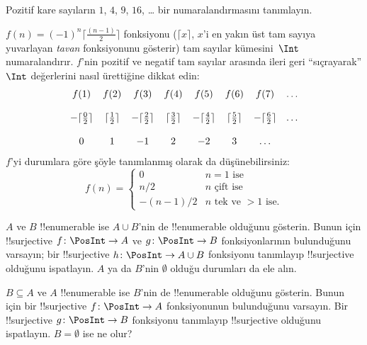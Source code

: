 \documentclass[../../../include/open-logic-section]{subfiles}
\begin{document}
\begin{prob}
Pozitif kare sayıların $1$, $4$, $9$, $16$, \dots{} bir numaralandırmasını
tanımlayın.
\end{prob}

\begin{ex}
$f(n) = (-1)^{n} \lceil \frac{(n-1)}{2}\rceil$ fonksiyonu ($\lceil x
\rceil$, $x$'i en yakın üst tam sayıya yuvarlayan \emph{tavan} fonksiyonunu
gösterir) tam sayılar kümesini~$\Int$ numaralandırır. $f$'nin pozitif ve
negatif tam sayılar arasında ileri geri ``sıçrayarak'' $\Int$ değerlerini
nasıl ürettiğine dikkat edin:
\[
\begin{array}{c c c c c c c c}
f(1) & f(2) & f(3) & f(4) & f(5) & f(6) & f(7) & \dots \\ \\
- \lceil \tfrac{0}{2} \rceil & \lceil \tfrac{1}{2}\rceil & - \lceil \tfrac{2}{2} \rceil & \lceil \tfrac{3}{2} \rceil & - \lceil \tfrac{4}{2} \rceil  & \lceil \tfrac{5}{2}
\rceil & - \lceil \tfrac{6}{2} \rceil & \dots \\ \\
0 & 1 & -1 & 2 & -2 & 3 & \dots
\end{array}
\]
$f$'yi durumlara göre şöyle tanımlanmış olarak da düşünebilirsiniz:
\[
f(n) = \begin{cases}
  0 & \text{$n = 1$ ise}\\
  n/2 & \text{$n$ çift ise}\\
  -(n-1)/2 & \text{$n$ tek ve $>1$ ise.}
  \end{cases}
\]
\end{ex}

\begin{prob}
  $A$ ve $B$ !!{enumerable} ise $A \cup B$'nin de !!{enumerable} olduğunu
  gösterin. Bunun için !!{surjective} $f\colon \PosInt \to A$ ve $g\colon
  \PosInt \to B$ fonksiyonlarının bulunduğunu varsayın; bir !!{surjective}
  $h\colon \PosInt \to A \cup B$ fonksiyonu tanımlayıp !!{surjective}
  olduğunu ispatlayın. $A$ ya da $B$'nin $\emptyset$ olduğu durumları da ele
  alın.
\end{prob}

\begin{prob}
  $B \subseteq A$ ve $A$ !!{enumerable} ise $B$'nin de !!{enumerable}
  olduğunu gösterin. Bunun için bir !!{surjective} $f\colon \PosInt \to A$
  fonksiyonunun bulunduğunu varsayın. Bir !!{surjective} $g\colon \PosInt
  \to B$ fonksiyonu tanımlayıp !!{surjective} olduğunu ispatlayın. $B =
  \emptyset$ ise ne olur?
\end{prob}
\end{document}
